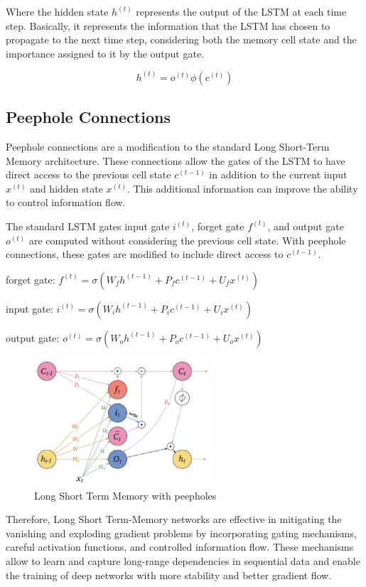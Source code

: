 \noindent Where the hidden state $h^{(t)}$ represents the output of the LSTM at each time step. Basically, it represents the information that the LSTM has chosen to propagate to the next time step, considering both the memory cell state and the importance assigned to it by the output gate.

$$ h^{(t)} = o^{(t)} \phi \left( c^{(t)}  \right)$$

\subsection{Peephole Connections}

Peephole connections are a modification to the standard Long Short-Term Memory architecture. These connections allow the gates of the LSTM to have direct access to the previous cell state $c^{(t-1)}$ in addition to the current input $x^{(t)}$ and hidden state $x^{(t)}$. This additional information can improve the ability to control information flow. 

\newpage
\noindent The standard LSTM gates input gate $i^{(t)}$, forget gate $f^{(t)}$, and output gate $o^{(t)}$ are computed without considering the previous cell state. With peephole connections, these gates are modified to include direct access to $c^{(t-1)}$.

forget gate: $ f^{(t)} = \sigma \left( W_f h^{(t-1)} + P_f c^{(t-1)} + U_f x^{(t)} \right)$

input gate: $ i^{(t)} = \sigma \left( W_i h^{(t-1)} + P_i c^{(t-1)} + U_i x^{(t)} \right)$

output gate: $ o^{(t)} = \sigma \left( W_o h^{(t-1)} + P_o c^{(t-1)} + U_o x^{(t)} \right)$

\begin{figure}[h]
    \centering
    \includegraphics[width=6.5cm]{Images/lstm-peepholes.png}
    \caption{Long Short Term Memory with peepholes}
    \label{fig:lstm-peephole}
\end{figure}

\noindent Therefore, Long Short Term-Memory networks are effective in mitigating the vanishing and exploding gradient problems by incorporating gating mechanisms, careful activation functions, and controlled information flow. These mechanisms allow to learn and capture long-range dependencies in sequential data and enable the training of deep networks with more stability and better gradient flow. 


